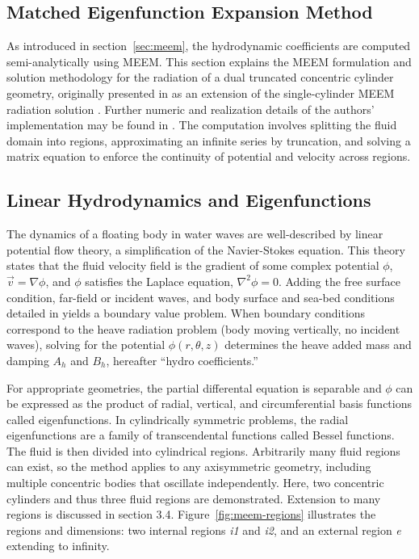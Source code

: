 \begin{appendices}
\section{Matched Eigenfunction Expansion Method}
\label{sec:MEEM_details}
As introduced in section~\ref{sec:meem}, the hydrodynamic coefficients are computed semi-analytically using MEEM.
This section explains the MEEM formulation and solution methodology for the radiation of a dual truncated concentric cylinder geometry, originally presented in \cite{mavrakos_hydrodynamic_2004,chau_inertia_2010,chau_inertia_2012} as an extension of the single-cylinder MEEM radiation solution \cite{yeung_added_1981}.
Further numeric and realization details of the authors' implementation may be found in \cite{mccabe_investigating_2025,khanal_openflash_2025,mccabe_open-source_2024}.
The computation involves splitting the fluid domain into regions, approximating an infinite series by truncation, and solving a matrix equation to enforce the continuity of potential and velocity across regions. 

\subsection{Linear Hydrodynamics and Eigenfunctions}
The dynamics of a floating body in water waves are well-described by linear potential flow theory, a simplification of the Navier-Stokes equation.
This theory states that the fluid velocity field  is the gradient of some complex potential $\phi$, $\vec{v}=\nabla\phi$, and $\phi$ satisfies the Laplace equation, $\nabla^2\phi=0$.
Adding the free surface condition, far-field or incident waves, and body surface and sea-bed conditions detailed in \cite{chatjigeorgiou_analytical_2018} yields a boundary value problem.
When boundary conditions correspond to the heave radiation problem (body moving vertically, no incident waves), solving for the potential $\phi(r,\theta,z)$ determines the heave added mass and damping $A_h$ and $B_h$, hereafter ``hydro coefficients.”

For appropriate geometries, the partial differental equation is separable and $\phi$ can be expressed as the product of radial, vertical, and circumferential basis functions called eigenfunctions.
In cylindrically symmetric problems, the radial eigenfunctions are a family of transcendental functions called Bessel functions.
The fluid is then divided into cylindrical regions.
Arbitrarily many fluid regions can exist, so the method applies to any axisymmetric geometry, including multiple concentric bodies that oscillate independently.
Here, two concentric cylinders and thus three fluid regions are demonstrated.
Extension to many regions is discussed in section 3.4.
Figure~\ref{fig:meem-regions} illustrates the regions and dimensions: two internal regions \textit{i1} and \textit{i2}, and an external region \textit{e} extending to infinity.


\end{appendices}
